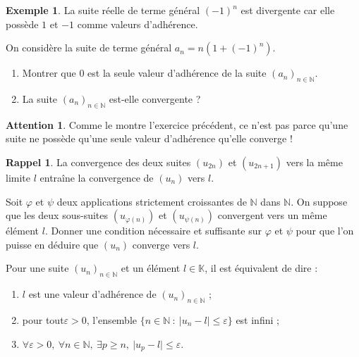 \documentclass[french]{article}
\newcommand{\N}{\mathbb{N}}
\newcommand{\K}{\mathbb{K}}
\theoremstyle{plain}
\theoremstyle{definition}
\newtheorem*{ex}{Exemple}
\newtheorem*{rappel}{Rappel}
\newtheorem*{attention}{Attention}
\theoremstyle{remark}
\begin{document}
\begin{ex}
	La suite réelle de terme général $(-1)^n$ est divergente car elle possède $1$ et $-1$ comme valeurs d'adhérence.
\end{ex}

\begin{exo}
	On considère la suite de terme général $a_n=n(1+(-1)^n)$.
	\begin{enumerate}
		\item Montrer que $0$ est la seule valeur d'adhérence de la suite $(a_n)_{n\in\N}$.
		\item La suite $(a_n)_{n\in\N}$ est-elle convergente ?
	\end{enumerate}
\end{exo}

\begin{attention}
	Comme le montre l'exercice précédent, ce n'est pas parce qu'une suite ne possède qu'une seule valeur d'adhérence qu'elle converge !
\end{attention}

\begin{rappel}
	La convergence des deux suites $(u_{2n})$ et $(u_{2n+1})$ vers la même limite $l$ entraîne la convergence de $(u_n)$ vers $l$.
\end{rappel}

\begin{exo}
	Soit $\varphi$ et $\psi$ deux applications strictement croissantes de $\N$ dans $\N$. On suppose que les deux sous-suites $(u_{\varphi(n)})$ et $(u_{\psi(n)})$ convergent vers un même élément $l$. Donner une condition nécessaire et suffisante sur $\varphi$ et $\psi$ pour que l'on puisse en déduire que $(u_n)$ converge vers $l$.
\end{exo}

\begin{prop}
	Pour une suite $(u_n)_{n\in\N}$ et un élément $l\in\K$, il est équivalent de dire :
	\begin{enumerate}[label=(\roman*)]
		\item $l$ est une valeur d'adhérence de $(u_n)_{n\in\N}$ ;
		\item pour tout$\varepsilon>0$, l'ensemble $\{n\in\N\ :\ \lvert u_n-l\rvert\leqslant\varepsilon\}$ est infini ;
		\item $\forall\varepsilon>0,\ \forall n\in\N,\ \exists p\geqslant n,\ \lvert u_p-l\rvert\leqslant\varepsilon$.
	\end{enumerate}	
\end{prop}
\end{document}
